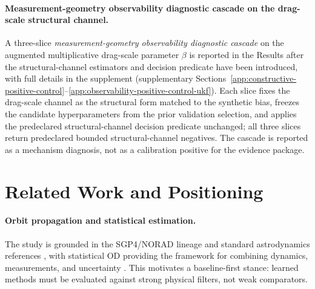 \documentclass{article}
\begin{document}
\paragraph{Measurement-geometry observability diagnostic cascade on the drag-scale structural channel.}
A three-slice \emph{measurement-geometry observability diagnostic cascade} on the augmented multiplicative drag-scale parameter $\beta$ is reported in the Results after the structural-channel estimators and decision predicate have been introduced, with full details in the supplement (supplementary Sections~\ref{app:constructive-positive-control}--\ref{app:observability-positive-control-ukf}). Each slice fixes the drag-scale channel as the structural form matched to the synthetic bias, freezes the candidate hyperparameters from the prior validation selection, and applies the predeclared structural-channel decision predicate unchanged; all three slices return predeclared bounded structural-channel negatives. The cascade is reported as a mechanism diagnosis, not as a calibration positive for the evidence package.

\section{Related Work and Positioning}
\paragraph{Orbit propagation and statistical estimation.}
The study is grounded in the SGP4/NORAD lineage and standard astrodynamics references \cite{hoots1980spacetrack,vallado2006sgp4,vallado2013,montenbruck2000}, with statistical OD providing the framework for combining dynamics, measurements, and uncertainty \cite{tapley2004statistical}. This motivates a baseline-first stance: learned methods must be evaluated against strong physical filters, not weak comparators.
\end{document}
